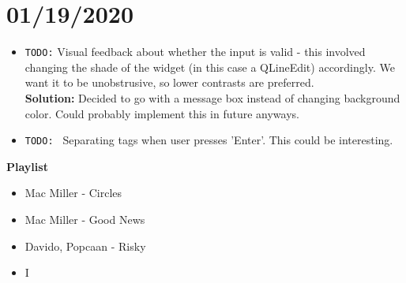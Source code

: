 \documentclass{article}
\begin{document}
\section{01/19/2020}
\begin{itemize}
	\item \texttt{TODO:} Visual feedback about whether the input is valid - this involved changing the shade of the widget (in this case a QLineEdit) accordingly. We want it to be unobstrusive, so lower contrasts are preferred.\\
	\textbf{Solution: }Decided to go with a message box instead of changing background color. Could probably implement this in future anyways.
	\item \texttt{TODO: } Separating tags when user presses 'Enter'. This could be interesting. 
\end{itemize}
\textbf{Playlist}
\begin{itemize}
	\item Mac Miller - Circles
	\item Mac Miller - Good News
	\item Davido, Popcaan - Risky
	\item I
\end{itemize}
\end{document}
